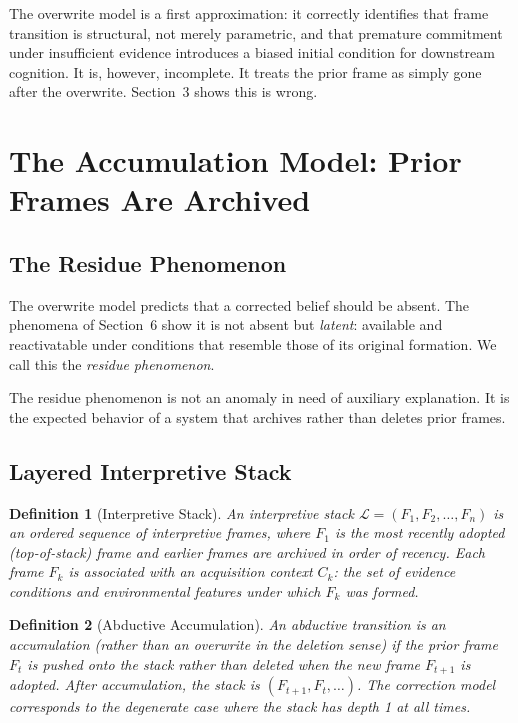 \documentclass[12pt]{article}
\newtheorem{definition}{Definition}
\begin{document}
The overwrite model is a first approximation: it correctly identifies
that frame transition is structural, not merely parametric, and that
premature commitment under insufficient evidence introduces a biased
initial condition for downstream cognition.
It is, however, incomplete.
It treats the prior frame as simply gone after the overwrite.
Section~3 shows this is wrong.

\section{The Accumulation Model: Prior Frames Are Archived}

\subsection{The Residue Phenomenon}

The overwrite model predicts that a corrected belief should be absent.
The phenomena of Section~6 show it is not absent but \emph{latent}:
available and reactivatable under conditions that resemble those of
its original formation.
We call this the \emph{residue phenomenon}.

The residue phenomenon is not an anomaly in need of auxiliary
explanation.
It is the expected behavior of a system that archives rather than
deletes prior frames.

\subsection{Layered Interpretive Stack}

\begin{definition}[Interpretive Stack]
An \emph{interpretive stack} $\mathcal{L} = (F_1, F_2, \ldots, F_n)$
is an ordered sequence of interpretive frames, where $F_1$ is the
most recently adopted (top-of-stack) frame and earlier frames are
archived in order of recency.
Each frame $F_k$ is associated with an \emph{acquisition context}
$C_k$: the set of evidence conditions and environmental features
under which $F_k$ was formed.
\end{definition}

\begin{definition}[Abductive Accumulation]
An abductive transition is an \emph{accumulation} (rather than an
overwrite in the deletion sense) if the prior frame $F_t$ is pushed
onto the stack rather than deleted when the new frame $F_{t+1}$ is
adopted.
After accumulation, the stack is $(F_{t+1}, F_t, \ldots)$.
The correction model corresponds to the degenerate case where the
stack has depth 1 at all times.
\end{definition}
\end{document}
